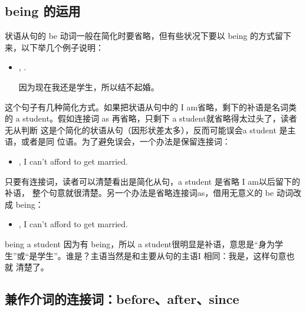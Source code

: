 \subsection{being 的运用}

状语从句的 be 动词一般在简化时要省略，但有些状况下要以 being
的方式留下来，以下举几个例子说明：
\begin{itemize}
\item {},  
  .

因为现在我还是学生，所以结不起婚。
\end{itemize}

这个句子有几种简化方式。如果把状语从句中的 I am省略，剩下的补语是名词类的 a
student。假如连接词 as 再省略，只剩下 a student就省略得太过头了，读者无从判断
这是个简化的状语从句（因形状差太多），反而可能误会a student 是主语，或者是同
位语。为了避免误会，一个办法是保留连接词：
\begin{itemize}
\item {}, I can't afford to get married.
\end{itemize}
只要有连接词，读者可以清楚看出是简化从句，a student 是省略 I am以后留下的补语，
整个句意就很清楚。另一个办法是省略连接词as，借用无意义的 be 动词改成 being：
\begin{itemize}
\item {}, I can't afford to get married.
\end{itemize}
being a student 因为有 being，所以 a student很明显是补语，意思是“身为学
生”或“是学生”。谁是？主语当然是和主要从句的主语I 相同：我是，这样句意也就
清楚了。

\subsection{兼作介词的连接词：before、after、since}

